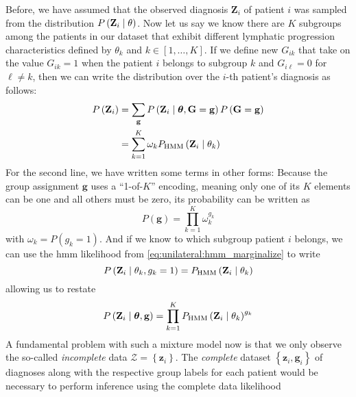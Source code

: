 \documentclass[\relativeRoot/main.tex]{subfiles}
\begin{document}
Before, we have assumed that the observed diagnosis $\mathbf{Z}_i$ of patient $i$ was sampled from the distribution $P \left( \mathbf{Z}_i \mid \theta \right)$. Now let us say we know there are $K$ subgroups among the patients in our dataset that exhibit different lymphatic progression characteristics defined by $\theta_k$ and $k \in [1, \ldots, K]$. If we define new  $G_{ik}$ that take on the value $G_{ik} = 1$ when the patient $i$ belongs to subgroup $k$ and $G_{i\ell} = 0$ for $\ell \neq k$, then we can write the distribution over the $i$-th patient's diagnosis as follows:
%
\begin{equation}
    \begin{aligned}
        P \left( \mathbf{Z}_i \right) &= \sum_{\mathbf{g}}{ P \left( \mathbf{Z}_i \mid \boldsymbol{\theta}, \mathbf{G} = \mathbf{g} \right) P \left(\mathbf{G} = \mathbf{g}\right) } \\
        &= \sum_{k=1}^K{ \omega_k P_\text{HMM} \left( \mathbf{Z}_i \mid \theta_k \right) }
    \end{aligned}
\end{equation}
%
For the second line, we have written some terms in other forms: Because the group assignment $\mathbf{g}$ uses a ``1-of-$K$'' encoding, meaning only one of its $K$ elements can be one and all others must be zero, its probability can be written as
%
\begin{equation}
    P \left(\mathbf{g}\right) = \prod_{k=1}^K{ \omega_k^{g_k} }
\end{equation}
%
with $\omega_k = P \left(g_k = 1\right)$. And if we know to which subgroup patient $i$ belongs, we can use the \gls{hmm} likelihood from \cref{eq:unilateral:hmm_marginalize} to write
%
\begin{equation}
    P \left( \mathbf{Z}_i \mid \theta_k, g_k = 1 \right) = P_\text{HMM} \left( \mathbf{Z}_i \mid \theta_k \right)
\end{equation}
%
allowing us to restate
%
\begin{equation}
    P \left( \mathbf{Z}_i \mid \boldsymbol{\theta}, \mathbf{g} \right) = \prod_{k=1}^K{ P_\text{HMM} \left( \mathbf{Z}_i \mid \theta_k \right)^{g_k} }
\end{equation}
%
A fundamental problem with such a mixture model now is that we only observe the so-called \emph{incomplete} data $\boldsymbol{\mathcal{Z}} = \left\{ \mathbf{z}_i \right\}$. The \emph{complete} dataset $\left\{ \mathbf{z}_i, \mathbf{g}_i \right\}$ of diagnoses along with the respective group labels for each patient would be necessary to perform inference using the complete data likelihood
\end{document}
